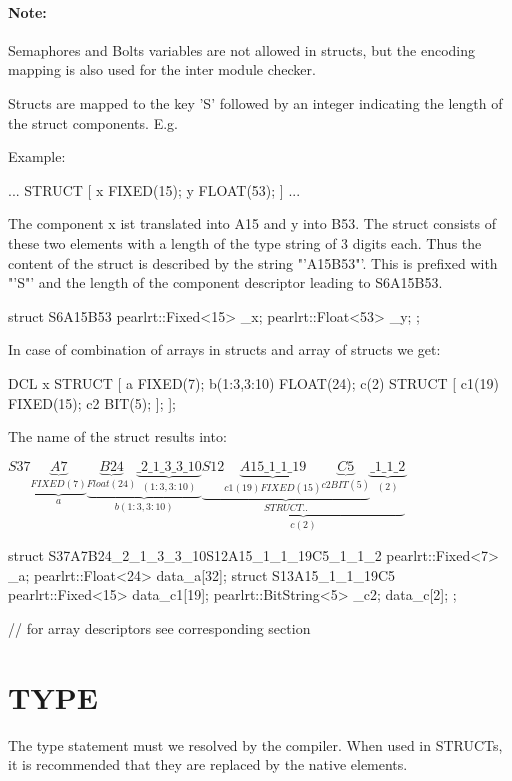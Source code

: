 \paragraph{Note:} Semaphores and Bolts variables are not allowed in structs,
but the encoding mapping is also used for the inter module checker.


Structs are mapped to the key 'S' followed by an integer
indicating the length of the struct components.
E.g. 

Example:
\begin{PEARLCode}
... STRUCT [ 
    x FIXED(15);
    y FLOAT(53);
    ]
...
\end{PEARLCode}

The component x ist translated into A15 and y into B53.
The struct consists of these two elements with a length of
the type string of 3 digits each. Thus the content
of the struct is described by the string "'A15B53"'.
This is prefixed with "'S"' and the length of the component
descriptor leading to S6A15B53.

\begin{CppCode}
struct S6A15B53 {
   pearlrt::Fixed<15> _x;
   pearlrt::Float<53> _y;
};
\end{CppCode}

In case of combination of arrays in structs and array of structs we get:

\begin{PEARLCode}
DCL x STRUCT [
   a FIXED(7);
   b(1:3,3:10) FLOAT(24);
   c(2) STRUCT [
     c1(19) FIXED(15);
     c2 BIT(5);
     ];
  ];
\end{PEARLCode}

The name of the struct results into: 

$S37\underbrace{\underbrace{A7}_{FIXED(7)}}_{a}\underbrace{\underbrace{B24}_{Float(24)}\underbrace{\_2\_1\_3\_3\_10}_{(1:3,3:10)}}_{b(1:3,3:10)}\underbrace{\underbrace{S12\underbrace{A15\_1\_1\_19}_{c1(19) FIXED(15)}\underbrace{C5}_{c2 BIT(5)}}_{STRUCT ..}\underbrace{\_1\_1\_2}_{(2)}}_{c(2)}$


\begin{CppCode}
struct S37A7B24_2_1_3_3_10S12A15_1_1_19C5_1_1_2 {
   pearlrt::Fixed<7> _a;
   pearlrt::Float<24> data_a[32];
   struct S13A15_1_1_19C5 {
     pearlrt::Fixed<15> data_c1[19];
     pearlrt::BitString<5>  _c2;
   } data_c[2];
};

// for array descriptors see corresponding section
\end{CppCode}


\section{TYPE}
The type statement must we resolved by the compiler. 
When used in STRUCTs, it is recommended that they are replaced by the
native elements.

